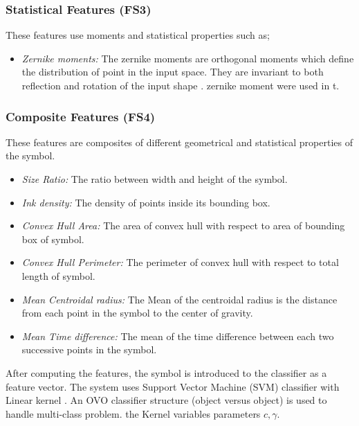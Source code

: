 \documentclass[preprint,1p,times,review]{elsarticle}
\begin{document}
\subsubsection{Statistical Features (FS3)}
These features use moments and statistical properties such as;
\begin{itemize}
	\item \emph{Zernike moments:} The zernike moments are orthogonal moments
which define the distribution of point in the input space. They are invariant to
both reflection and rotation of the input shape \cite{ZerMomentOrthogonal}. %
zernike moment were used in \cite{HeloiseBeautification} t.
\end{itemize}
\subsubsection{Composite Features (FS4)}
 These features are composites of different geometrical and statistical
properties of the symbol.
	\begin{itemize}
\item \emph{Size Ratio:} The ratio between width and height of the symbol.
	\item \emph{Ink density:} The density of points inside its bounding
box\cite{GeometryAndDomain102}.
 	\item \emph{Convex Hull Area:} The area of convex hull with respect to
area of bounding box of symbol.
	\item \emph{Convex Hull Perimeter:} The perimeter of convex hull with
respect to total length of symbol.
		\item \emph{Mean Centroidal radius:} The Mean of the centroidal
radius is the distance from each point in the symbol to the center of gravity.
	\item \emph{Mean Time difference:} The mean of the time difference
between each two successive points in the symbol.
  \end{itemize}

 After computing the features, the symbol is introduced to the classifier as a
feature vector. The system uses Support Vector Machine (SVM) classifier with
Linear kernel \cite{libsvm}. An OVO classifier structure (object versus object)
is used to handle multi-class problem.%
the Kernel variables parameters $c, \gamma$.

\end{document}
